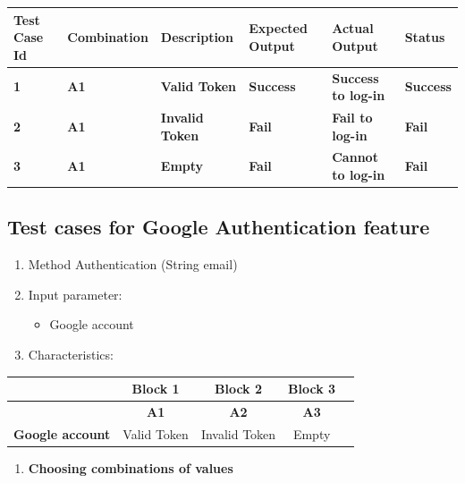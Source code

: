 \begin{longtable}{|p{1cm}|p{2cm}|p{3cm}|p{2.5cm}|p{3cm}|p{1.5cm}|}
\hline
\textbf{Test Case Id} & \textbf{Combination} & \textbf{Description} & \textbf{Expected Output} & \textbf{Actual Output} & \textbf{Status} \\
\hline
\textbf{1} & \textbf{A1} & \textbf{Valid Token} & \textbf{Success} & \textbf{Success to log-in} & \textbf{Success} \\
\hline
\textbf{2} & \textbf{A1} & \textbf{Invalid Token} & \textbf{Fail} & \textbf{Fail to log-in} & \textbf{Fail} \\
\hline
\textbf{3} & \textbf{A1} & \textbf{Empty} & \textbf{Fail} & \textbf{Cannot to log-in} & \textbf{Fail} \\
\hline
\end{longtable}


\subsection*{Test cases for Google Authentication feature}

\begin{enumerate}
    \item Method Authentication (String email)
    \item Input parameter:
    \begin{itemize}
        \item Google account
    \end{itemize}
    \item Characteristics:
\end{enumerate}


\begin{table}[h!]
    \centering
    \begin{tabular}{|c|c|c|c|c|}
    \hline
    \textbf{} & \textbf{Block 1} & \textbf{Block 2} & \textbf{Block 3}  \\
    \hline
    \textbf{} & \textbf{A1} & \textbf{A2} & \textbf{A3}  \\
    \hline
    \textbf{Google account} & Valid Token & Invalid Token & Empty \\
    \hline
    \end{tabular}
    \end{table}
    

\begin{enumerate}[resume]
    \item \textbf{Choosing combinations of values}
\end{enumerate}


